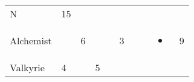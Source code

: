 \documentclass[12pt]{article}
\begin{document}
\begin{longtable}[]{@{}llllllllll@{}}
\begin{minipage}[t]{0.07\columnwidth}
N
\strut\end{minipage} &
\begin{minipage}[t]{0.08\columnwidth}\raggedright\strut
15
\strut\end{minipage}\tabularnewline
\begin{minipage}[t]{0.13\columnwidth}\raggedright\strut
Alchemist
\strut\end{minipage} &
\begin{minipage}[t]{0.06\columnwidth}\raggedright\strut
\strut\end{minipage} &
\begin{minipage}[t]{0.06\columnwidth}\raggedright\strut
6
\strut\end{minipage} &
\begin{minipage}[t]{0.06\columnwidth}\raggedright\strut
\strut\end{minipage} &
\begin{minipage}[t]{0.06\columnwidth}\raggedright\strut
\strut\end{minipage} &
\begin{minipage}[t]{0.06\columnwidth}\raggedright\strut
3
\strut\end{minipage} &
\begin{minipage}[t]{0.06\columnwidth}\raggedright\strut
\strut\end{minipage} &
\begin{minipage}[t]{0.06\columnwidth}\raggedright\strut
\strut\end{minipage} &
\begin{minipage}[t]{0.07\columnwidth}\raggedright\strut
\begin{itemize}
\item
\end{itemize}
\strut\end{minipage} &
\begin{minipage}[t]{0.08\columnwidth}\raggedright\strut
9
\strut\end{minipage}\tabularnewline
\begin{minipage}[t]{0.13\columnwidth}\raggedright\strut
Valkyrie
\strut\end{minipage} &
\begin{minipage}[t]{0.06\columnwidth}\raggedright\strut
4
\strut\end{minipage} &
\begin{minipage}[t]{0.06\columnwidth}\raggedright\strut
\strut\end{minipage} &
\begin{minipage}[t]{0.06\columnwidth}\raggedright\strut
5

\end{minipage}
\end{longtable}
\end{document}
